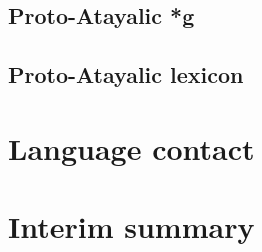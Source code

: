 \subsection{Proto-Atayalic *g}
\lipsum[1]
\subsection{Proto-Atayalic lexicon}
\lipsum[1]

\section{Language contact}
\lipsum[1]


\section{Interim summary}
\lipsum[1]